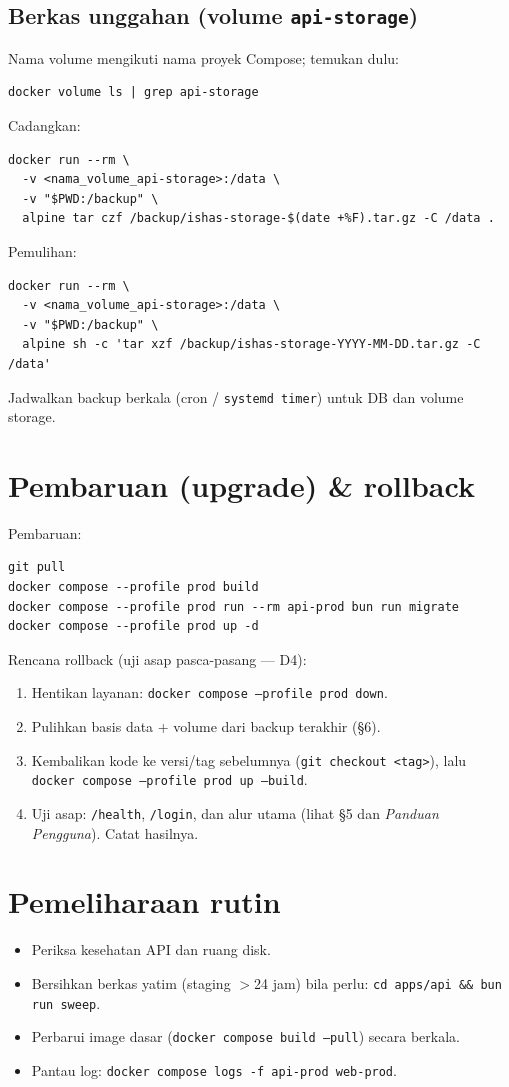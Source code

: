 \documentclass[11pt,a4paper]{article}
\newcommand{\code}[1]{\texttt{#1}}
\begin{document}
\subsection{Berkas unggahan (volume \code{api-storage})}
Nama volume mengikuti nama proyek Compose; temukan dulu:
\begin{lstlisting}
docker volume ls | grep api-storage
\end{lstlisting}
Cadangkan:
\begin{lstlisting}
docker run --rm \
  -v <nama_volume_api-storage>:/data \
  -v "$PWD:/backup" \
  alpine tar czf /backup/ishas-storage-$(date +%F).tar.gz -C /data .
\end{lstlisting}
Pemulihan:
\begin{lstlisting}
docker run --rm \
  -v <nama_volume_api-storage>:/data \
  -v "$PWD:/backup" \
  alpine sh -c 'tar xzf /backup/ishas-storage-YYYY-MM-DD.tar.gz -C /data'
\end{lstlisting}
Jadwalkan backup berkala (cron / \code{systemd timer}) untuk DB dan volume storage.

\section{Pembaruan (upgrade) \& rollback}
Pembaruan:
\begin{lstlisting}
git pull
docker compose --profile prod build
docker compose --profile prod run --rm api-prod bun run migrate
docker compose --profile prod up -d
\end{lstlisting}

\noindent Rencana rollback (uji asap pasca-pasang --- D4):
\begin{enumerate}
  \item Hentikan layanan: \code{docker compose --profile prod down}.
  \item Pulihkan basis data + volume dari backup terakhir (\S6).
  \item Kembalikan kode ke versi/tag sebelumnya (\code{git checkout <tag>}), lalu
        \code{docker compose --profile prod up --build}.
  \item Uji asap: \code{/health}, \code{/login}, dan alur utama (lihat \S5 dan
        \emph{Panduan Pengguna}). Catat hasilnya.
\end{enumerate}

\section{Pemeliharaan rutin}
\begin{itemize}
  \item Periksa kesehatan API dan ruang disk.
  \item Bersihkan berkas yatim (staging $>$24 jam) bila perlu:
        \code{cd apps/api \&\& bun run sweep}.
  \item Perbarui image dasar (\code{docker compose build --pull}) secara berkala.
  \item Pantau log: \code{docker compose logs -f api-prod web-prod}.
\end{itemize}
\end{document}
